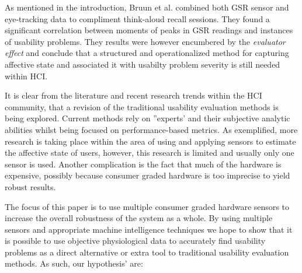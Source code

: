 As mentioned in the introduction, Bruun et al. combined both GSR sensor and
eye-tracking data to compliment think-aloud recall sessions. They found a
significant correlation between moments of peaks in GSR readings and instances
of usability problems. They results were however encumbered by the
\textit{evaluator effect} and conclude that a structured and operationalized
method for capturing affective state and associated it with usabilty problem
severity is still needed within HCI.

It is clear from the literature and recent research trends within the HCI community, that a revision of the traditional usability evaluation methods is being explored. 
Current methods rely on ''experts' and their subjective analytic abilities whilst being focused on performance-based metrics.
As exemplified, more research is taking place within the area of using and applying sensors to estimate the affective state of users, however, this research is limited and usually only one sensor is used. 
Another complication is the fact that much of the hardware is expensive, possibly because consumer graded hardware is too imprecise to yield robust results.

The focus of this paper is to use multiple consumer graded hardware sensors to increase the overall robustness of the system as a whole. 
By using multiple sensors and appropriate machine intelligence techniques we hope to show that it is possible to use objective physiological data to accurately find usability problems as a direct alternative or extra tool to traditional usability evaluation methods. 
As such, our hypothesis' are:\\\\

\newcommand{\hypo}[2]{%
  \textbf{H#1:} \textit{#2} \\
}

